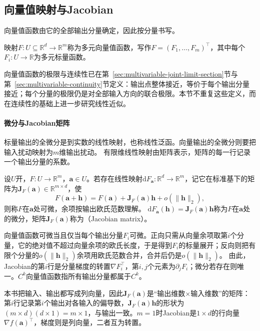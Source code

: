 \subsection{向量值映射与Jacobian}

向量值函数由它的全部输出分量确定，因此按分量书写。
\begin{definition}[多元向量值函数]
\label{def:multivariable-vector-function}
映射$F:U\subseteq\mathbb R^d\to\mathbb R^m$称为多元向量值函数，写作$F=(F_1,\ldots,F_m)^\top$，其中每个$F_i:U\to\mathbb R$为多元标量函数。
\end{definition}
向量值函数的极限与连续性已在第~\ref{sec:multivariable-joint-limit-section}节与第~\ref{sec:multivariable-continuity}节定义：输出点整体接近，等价于每个输出分量接近；每个分量的极限仍是对全部输入方向的联合极限。本节不重复这些定义，而在连续性的基础上进一步研究线性近似。

\paragraph{微分与Jacobian矩阵}

标量输出的全微分是到实数的线性映射，也称线性泛函。向量输出的全微分则要把输入扰动映射为$m$维输出扰动。
有限维线性映射由矩阵表示，矩阵的每一行记录一个输出分量的系数。
\begin{definition}[向量值函数的微分]
\label{def:multivariable-vector-differential}
设$U$开，$F:U\to\mathbb R^m$，$\bm a\in U$。若存在线性映射$\mathrm dF_{\bm a}:\mathbb R^d\to\mathbb R^m$，记它在标准基下的矩阵为$\bm J_F(\bm a)\in\mathbb R^{m\times d}$，使
\begin{equation}
 F(\bm a+\bm h)=F(\bm a)+\bm J_F(\bm a)\bm h+o(\lVert\bm h\rVert_2),
\label{eq:analysis-jacobian-linearization}
\end{equation}
则称$F$在$\bm a$处可微，余项按输出欧氏范数理解。
$\mathrm dF_{\bm a}(\bm h)=\bm J_F(\bm a)\bm h$称为$F$在$\bm a$处的微分，矩阵$\bm J_F(\bm a)$称为（Jacobian matrix）。
\end{definition}
向量值函数可微当且仅当每个输出分量$F_i$可微。正向只需从向量余项取第$i$个分量，它的绝对值不超过向量余项的欧氏长度，于是得到$F_i$的标量展开；反向则把有限个分量的$o(\lVert\bm h\rVert_2)$余项用欧氏范数合并，合并后仍是$o(\lVert\bm h\rVert_2)$。
由此，Jacobian的第$i$行是分量梯度的转置$\nabla F_i^\top$，第$i,j$个元素为$\partial_jF_i$；微分若存在则唯一。$C^k$向量值函数指所有输出分量都属于$C^k$。

本书把输入、输出都写成列向量，因此$\bm J_F(\bm a)$是“输出维数$\times$输入维数”的矩阵：第$i$行记录第$i$个输出对各输入的偏导数，$\bm J_F(\bm a)\bm h$的形状为$(m\times d)(d\times1)=m\times1$，与输出一致。$m=1$时Jacobian是$1\times d$的行向量$\nabla f(\bm a)^\top$，梯度则是列向量，二者互为转置。

